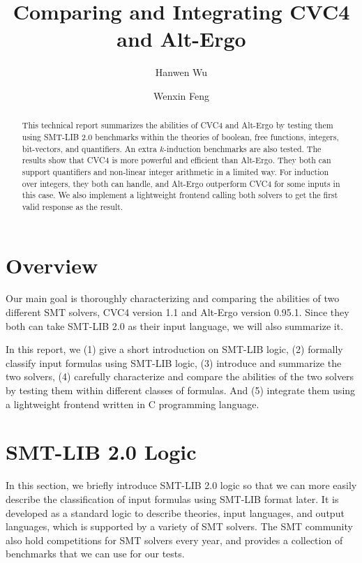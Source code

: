 \documentclass[10pt,letter]{article}
\title{\bf Comparing and Integrating CVC4 and Alt-Ergo}
\author{Hanwen Wu}
\author{Wenxin Feng}
\affil{Department of Computer Science\\Boston University\\
\small\texttt{\{hwwu,wenxinf\}@bu.edu}}
\theoremstyle{definition}
\begin{document}
\maketitle

\begin{abstract}
This technical report summarizes the abilities of CVC4 and Alt-Ergo by testing them using SMT-LIB 2.0 benchmarks within the theories of boolean, free functions, integers, bit-vectors, and quantifiers. An extra $k$-induction benchmarks are also tested. The results show that CVC4 is more powerful and efficient than Alt-Ergo. They both can support quantifiers and non-linear integer arithmetic in a limited way. For induction over integers, they both can handle, and Alt-Ergo outperform CVC4 for some inputs in this case. We also implement a lightweight frontend calling both solvers to get the first valid response as the result.
\end{abstract}
\section{Overview}




Our main goal is thoroughly characterizing and comparing the abilities of two different SMT solvers, CVC4\cite{barrett:cvc4:2011} version 1.1 and Alt-Ergo\cite{alt-ergo} version 0.95.1. Since they both can take SMT-LIB 2.0\cite{bs2010} as their input language, we will also summarize it.

In this report, we (1) give a short introduction on SMT-LIB logic, (2) formally classify input formulas using SMT-LIB logic, (3) introduce and summarize the two solvers, (4) carefully characterize and compare the abilities of the two solvers by testing them within different classes of formulas. And (5) integrate them using a lightweight frontend written in C programming language.

\section{SMT-LIB 2.0 Logic}

In this section, we briefly introduce SMT-LIB 2.0 logic so that we can more easily describe the classification of input formulas using SMT-LIB format later. It is developed as a standard logic to describe theories, input languages, and output languages, which is supported by a variety of SMT solvers. The SMT community also hold competitions for SMT solvers every year, and provides a collection of benchmarks that we can use for our tests.
\end{document}
